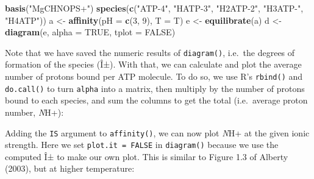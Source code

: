 \documentclass[]{tufte-handout}
\newenvironment{Shaded}{}{}
\newcommand{\KeywordTok}[1]{\textcolor[rgb]{0.00,0.44,0.13}{\textbf{#1}}}
\newcommand{\DataTypeTok}[1]{\textcolor[rgb]{0.56,0.13,0.00}{#1}}
\newcommand{\DecValTok}[1]{\textcolor[rgb]{0.25,0.63,0.44}{#1}}
\newcommand{\StringTok}[1]{\textcolor[rgb]{0.25,0.44,0.63}{#1}}
\newcommand{\OtherTok}[1]{\textcolor[rgb]{0.00,0.44,0.13}{#1}}
\newcommand{\OperatorTok}[1]{\textcolor[rgb]{0.40,0.40,0.40}{#1}}
\newcommand{\NormalTok}[1]{#1}
\begin{document}
\begin{Shaded}
\begin{Highlighting}[]
\KeywordTok{basis}\NormalTok{(}\StringTok{"MgCHNOPS+"}\NormalTok{)}
\KeywordTok{species}\NormalTok{(}\KeywordTok{c}\NormalTok{(}\StringTok{"ATP-4"}\NormalTok{, }\StringTok{"HATP-3"}\NormalTok{, }\StringTok{"H2ATP-2"}\NormalTok{, }\StringTok{"H3ATP-"}\NormalTok{, }\StringTok{"H4ATP"}\NormalTok{))}
\NormalTok{a <-}\StringTok{ }\KeywordTok{affinity}\NormalTok{(}\DataTypeTok{pH =} \KeywordTok{c}\NormalTok{(}\DecValTok{3}\NormalTok{, }\DecValTok{9}\NormalTok{), }\DataTypeTok{T =}\NormalTok{ T)}
\NormalTok{e <-}\StringTok{ }\KeywordTok{equilibrate}\NormalTok{(a)}
\NormalTok{d <-}\StringTok{ }\KeywordTok{diagram}\NormalTok{(e, }\DataTypeTok{alpha =} \OtherTok{TRUE}\NormalTok{, }\DataTypeTok{tplot =} \OtherTok{FALSE}\NormalTok{)}
\end{Highlighting}
\end{Shaded}

Note that we have saved the numeric results of {\texttt{diagram()}},
i.e.~the degrees of formation of the species (Î±). With that, we can
calculate and plot the average number of protons bound per ATP molecule.
To do so, we use R's \texttt{rbind()} and \texttt{do.call()} to turn
\texttt{alpha} into a matrix, then multiply by the number of protons
bound to each species, and sum the columns to get the total
(i.e.~average proton number, \emph{N}H+):

\begin{Shaded}
\end{Shaded}

Adding the \texttt{IS} argument to {\texttt{affinity()}}, we can now
plot \emph{N}H+ at the given ionic strength. Here we set
\texttt{plot.it\ =\ FALSE} in \texttt{diagram()} because we use the
computed Î± to make our own plot. This is similar to Figure 1.3 of
Alberty (2003), but at higher temperature:
\end{document}
